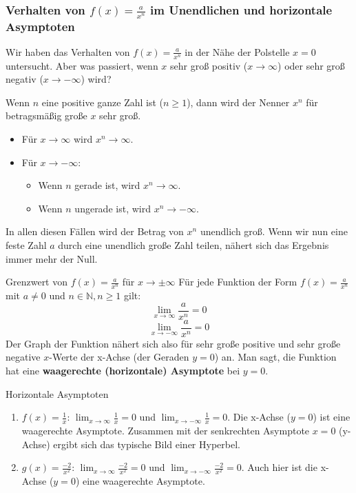 



\subsubsection{Verhalten von $f(x) = \frac{a}{x^n}$ im Unendlichen und horizontale Asymptoten}

Wir haben das Verhalten von $f(x) = \frac{a}{x^n}$ in der Nähe der Polstelle $x=0$ untersucht. Aber was passiert, wenn $x$ sehr groß positiv ($x \to \infty$) oder sehr groß negativ ($x \to -\infty$) wird?

Wenn $n$ eine positive ganze Zahl ist ($n \ge 1$), dann wird der Nenner $x^n$ für betragsmäßig große $x$ sehr groß.
\begin{itemize}
    \item Für $x \to \infty$ wird $x^n \to \infty$.
    \item Für $x \to -\infty$:
        \begin{itemize}
            \item Wenn $n$ gerade ist, wird $x^n \to \infty$.
            \item Wenn $n$ ungerade ist, wird $x^n \to -\infty$.
        \end{itemize}
\end{itemize}
In allen diesen Fällen wird der Betrag von $x^n$ unendlich groß. Wenn wir nun eine feste Zahl $a$ durch eine unendlich große Zahl teilen, nähert sich das Ergebnis immer mehr der Null.

\begin{merksatzumgebung}{Grenzwert von $f(x) = \frac{a}{x^n}$ für $x \to \pm\infty$}
Für jede Funktion der Form $f(x) = \frac{a}{x^n}$ mit $a \neq 0$ und $n \in \mathbb{N}, n \ge 1$ gilt:
\[ \lim_{x \to \infty} \frac{a}{x^n} = 0 \]
\[ \lim_{x \to -\infty} \frac{a}{x^n} = 0 \]
Der Graph der Funktion nähert sich also für sehr große positive und sehr große negative $x$-Werte der x-Achse (der Geraden $y=0$) an. Man sagt, die Funktion hat eine \textbf{waagerechte (horizontale) Asymptote} bei $y=0$.
\end{merksatzumgebung}

\begin{beispielumgebung}{Horizontale Asymptoten}
\begin{enumerate}
    \item $f(x) = \frac{1}{x}$:
        $\lim_{x \to \infty} \frac{1}{x} = 0$ und $\lim_{x \to -\infty} \frac{1}{x} = 0$.
        Die x-Achse ($y=0$) ist eine waagerechte Asymptote.
        Zusammen mit der senkrechten Asymptote $x=0$ (y-Achse) ergibt sich das typische Bild einer Hyperbel.

    \item $g(x) = \frac{-2}{x^2}$:
        $\lim_{x \to \infty} \frac{-2}{x^2} = 0$ und $\lim_{x \to -\infty} \frac{-2}{x^2} = 0$.
        Auch hier ist die x-Achse ($y=0$) eine waagerechte Asymptote.
\end{enumerate}
\end{beispielumgebung}

